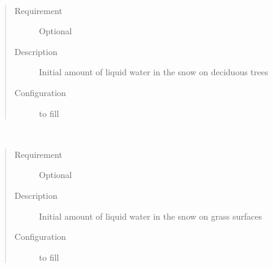\documentclass[letterpaper,10pt,english]{sphinxmanual}
\begin{document}
\begin{fulllineitems}
\label{\detokenize{input_files/Initial_Conditions/Snow_related_parameters:cmdoption-arg-snowwaterdectrstate}}~\begin{quote}\begin{description}
\item[{Requirement}] \leavevmode
Optional

\item[{Description}] \leavevmode
Initial amount of liquid water in the snow on deciduous trees

\item[{Configuration}] \leavevmode
to fill

\end{description}\end{quote}

\end{fulllineitems}


\begin{fulllineitems}
\label{\detokenize{input_files/Initial_Conditions/Snow_related_parameters:cmdoption-arg-snowwatergrassstate}}~\begin{quote}\begin{description}
\item[{Requirement}] \leavevmode
Optional

\item[{Description}] \leavevmode
Initial amount of liquid water in the snow on grass surfaces

\item[{Configuration}] \leavevmode
to fill

\end{description}\end{quote}

\end{fulllineitems}

\end{document}
